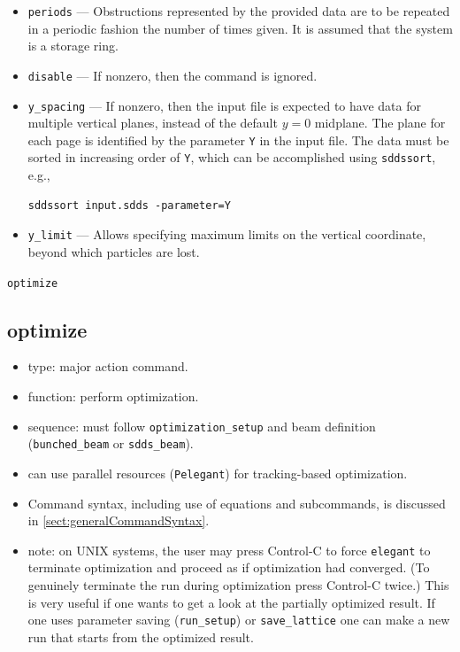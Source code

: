 \documentclass[11pt]{article}
\begin{document}
\begin{itemize}
\item \verb|periods| --- Obstructions represented by the provided data are to be repeated in a 
  periodic fashion the number of times given. It is assumed that the system is a storage ring.
\item \verb|disable| --- If nonzero, then the command is ignored.
\item \verb|y_spacing| --- If nonzero, then the input file is expected to have data for multiple vertical planes,
  instead of the default $y=0$ midplane. The plane for each page is identified by the parameter \verb|Y| in the
  input file. The data must be sorted in increasing order of \verb|Y|, which can be accomplished using \verb|sddssort|, e.g.,
\begin{verbatim}
sddssort input.sdds -parameter=Y
\end{verbatim}

\item \verb|y_limit| --- Allows specifying maximum limits on the vertical coordinate, beyond which particles are lost.
\end{itemize}

\newpage
\begin{center}{\Large\verb|optimize|}\end{center}
\subsection{optimize \label{subsec:optimize}}

\begin{itemize}
\item type: major action command.
\item function: perform optimization.
\item sequence: must follow \verb|optimization_setup| and beam definition (\verb|bunched_beam| or \verb|sdds_beam|).
\item can use parallel resources (\verb|Pelegant|) for tracking-based optimization.
\item Command syntax, including use of equations and subcommands, is discussed in \ref{sect:generalCommandSyntax}.
\item note: on UNIX systems, the user may press Control-C to force
\verb|elegant| to terminate optimization and proceed as if
optimization had converged.  (To genuinely terminate the run during
optimization press Control-C twice.) This is very useful if one wants
to get a look at the partially optimized result.  If one uses parameter
saving (\verb|run_setup|) or \verb|save_lattice| one can make a new
run that starts from the optimized result.
\end{itemize}
\end{document}
